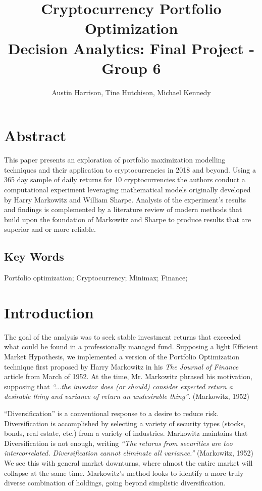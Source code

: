 \documentclass[12pt]{article} %
\title{Cryptocurrency Portfolio Optimization\\
\large Decision Analytics:  Final Project - Group 6}
\author{Austin Harrison, Tine Hutchison, Michael Kennedy}
\begin{document}
\maketitle


\section{Abstract}

This paper presents an exploration of portfolio maximization modelling techniques and their application to cryptocurrencies in 2018 and beyond.  Using a 365 day sample of daily returns for 10 cryptocurrencies the authors conduct a computational experiment leveraging mathematical models originally developed by Harry Markowitz and William Sharpe.  Analysis of the experiment’s results and findings is complemented by a literature review of modern methods that build upon the foundation of Markowitz and Sharpe to produce results that are superior and or more reliable.

\subsection{Key Words}

Portfolio optimization; Cryptocurrency; Minimax; Finance;

\section{Introduction}

The goal of the analysis was to seek stable investment returns that exceeded what could be found in a professionally managed fund. Supposing a light Efficient Market Hypothesis, we implemented a version of the Portfolio Optimization technique first proposed by Harry Markowitz in his\emph{ The Journal of Finance} article from March of 1952. At the time, Mr. Markowitz phrased his motivation, supposing that\emph{ ``...the investor does (or should) consider expected return a desirable thing and variance of return an undesirable thing”}. (Markowitz, 1952)

``Diversification” is a conventional response to a desire to reduce risk. Diversification is accomplished by selecting a variety of security types (stocks, bonds, real estate, etc.) from a variety of industries. Markowitz maintains that Diversification is not enough, writing \emph{``The returns from securities are too intercorrelated. Diversification cannot eliminate all variance.”} (Markowitz, 1952) We see this with general market downturns, where almost the entire market will collapse at the same time. Markowitz’s method looks to identify a more truly diverse combination of holdings, going beyond simplistic diversification.
\end{document}
